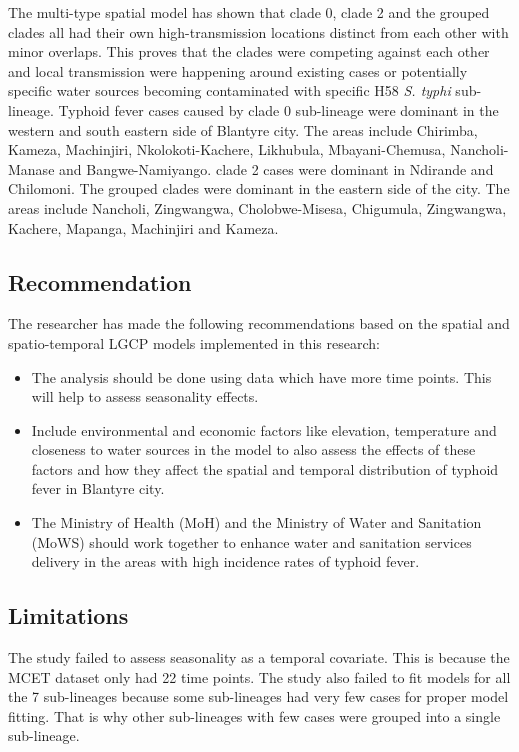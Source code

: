 \documentclass[12pt,a4paper]{report}
\begin{document}
The multi-type spatial model has shown that clade 0, clade 2 and the grouped clades all had their own high-transmission locations distinct from each other with minor overlaps. This proves that the clades were competing against each other and local transmission were happening around existing cases or potentially specific water sources becoming contaminated with specific H58 \textit{S. typhi} sub-lineage. Typhoid fever cases caused by clade 0 sub-lineage were dominant in the western and south eastern side of Blantyre city. The areas include Chirimba, Kameza, Machinjiri, Nkolokoti-Kachere, Likhubula, Mbayani-Chemusa, Nancholi-Manase and Bangwe-Namiyango. clade 2 cases were dominant in Ndirande and Chilomoni. The grouped clades were dominant in the eastern side of the city. The areas include Nancholi, Zingwangwa, Cholobwe-Misesa, Chigumula, Zingwangwa, Kachere, Mapanga, Machinjiri and Kameza.

\subsection{Recommendation}

The researcher has made the following recommendations based on the spatial and spatio-temporal LGCP models implemented in this research:

\begin{itemize}
\item The analysis should be done using data which have more time points. This will help to assess seasonality effects.
\item Include environmental and economic factors like elevation, temperature and closeness to water sources in the model to also assess the effects of these factors and how they affect the spatial and temporal distribution of typhoid fever in Blantyre city.
\item The Ministry of Health (MoH) and the Ministry of Water and Sanitation (MoWS) should work together to enhance water and sanitation services delivery in the areas with high incidence rates of typhoid fever.
\end{itemize}

\subsection{Limitations}

The study failed to assess seasonality as a temporal covariate. This is because the MCET dataset only had 22 time points. The study also failed to fit models for all the 7 sub-lineages because some sub-lineages had very few cases for proper model fitting. That is why other sub-lineages with few cases were grouped into a single sub-lineage. 
\end{document}
